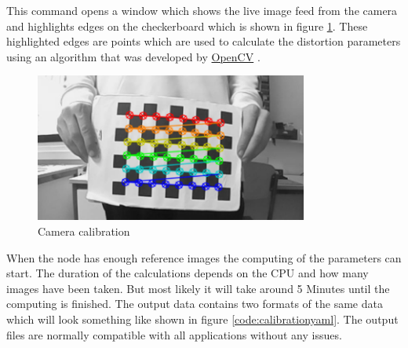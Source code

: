 This command opens a window which shows the live image feed from the camera and highlights edges on the checkerboard which is shown in figure \ref{img:cameracalibration}. These highlighted edges are points which are used to calculate the distortion parameters using an algorithm that was developed by \href{https://docs.opencv.org/2.4/doc/tutorials/calib3d/camera_calibration/camera_calibration.html}{OpenCV} \cite{cameracalibrationopencv}.\newline
\begin{figure}[h]
	\centering
	\includegraphics[width=0.8\textwidth]{./media/images/CameraCalibration.png}
  	\caption{Camera calibration}
  	\label{img:cameracalibration}
\end{figure} \newline

When the node has enough reference images the computing of the parameters can start. The duration of the calculations depends on the CPU and how many images have been taken. But most likely it will take around 5 Minutes until the computing is finished. The output data contains two formats of the same data which will look something like shown in figure \ref{code:calibrationyaml}. The output files are normally compatible with all applications without any issues.\newline




